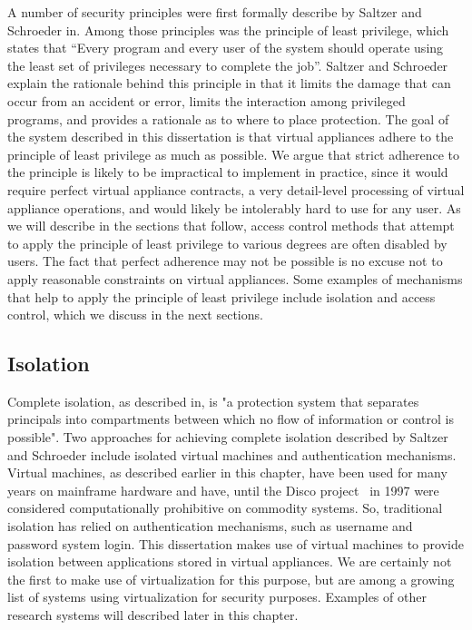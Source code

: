 A number of security principles were first formally describe by Saltzer and Schroeder in\cite{saltzer_1975}. Among those principles was the principle of least privilege, which states that ``Every program and every user of the system should operate using the least set of privileges necessary to complete the job''. Saltzer and Schroeder explain the rationale behind this principle in that it limits the damage that can occur from an accident or error, limits the interaction among privileged programs, and provides a rationale as to where to place protection. The goal of the system described in this dissertation is that virtual appliances adhere to the principle of least privilege as much as possible. We argue that strict adherence to the principle is likely to be impractical to implement in practice, since it would require perfect virtual appliance contracts, a very detail-level processing of virtual appliance operations, and would likely be intolerably hard to use for any user. As we will describe in the sections that follow, access control methods that attempt to apply the principle of least privilege to various degrees are often disabled by users. The fact that perfect adherence may not be possible is no excuse not to apply reasonable constraints on virtual appliances. Some examples of mechanisms that help to apply the principle of least privilege include isolation and access control, which we discuss in the next sections.


\subsection{Isolation}

Complete isolation, as described in\cite{saltzer_1975}, is "a protection system that separates principals into compartments between which no flow of information or control is possible". Two approaches for achieving complete isolation described by Saltzer and Schroeder include isolated virtual machines and authentication mechanisms. Virtual machines, as described earlier in this chapter, have been used for many years on mainframe hardware and have, until the Disco project~\cite{bugnion_1997} in 1997 were considered computationally prohibitive on commodity systems. So, traditional isolation has relied on authentication mechanisms, such as username and password system login. This dissertation makes use of virtual machines to provide isolation between applications stored in virtual appliances. We are certainly not the first to make use of virtualization for this purpose, but are among a growing list of systems using virtualization for security purposes. Examples of other research systems will described later in this chapter. 

